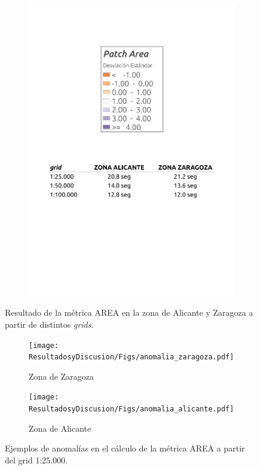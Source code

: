 \begin{figure}
\begin{subfigure}[b]{0.4\textwidth}
    \includegraphics[width=\textwidth]{ResultadosyDiscusion/Figs/Results/leyenda1.pdf}
    \label{fig:leyenda1}
  \end{subfigure}
  
  
  \caption{Resultado de la métrica AREA en la zona de Alicante y Zaragoza a partir de distintos \textit{grids}.}
  \label{fig:p_area}
  \end{figure}






\begin{figure}
  \centering
  \begin{subfigure}[b]{0.7\textwidth}
    \texttt{[image: ResultadosyDiscusion/Figs/anomalia\_zaragoza.pdf]}
    \caption{Zona de Zaragoza}
    \label{fig:p_25}   
  \end{subfigure}             
  \begin{subfigure}[b]{0.7\textwidth}
    \texttt{[image: ResultadosyDiscusion/Figs/anomalia\_alicante.pdf]}
    \caption{Zona de Alicante}
    \label{fig:p_50}
  \end{subfigure}             
  
  \caption{Ejemplos de anomalías en el cálculo de la métrica AREA a partir del grid 1:25.000.}
  \label{fig:anomalia}
  \end{figure}







